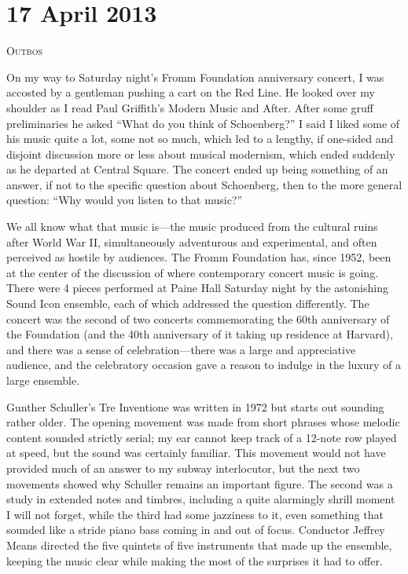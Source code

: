 \chapter{17 April 2013}

\textsc{Outbos}

On my way to Saturday night’s Fromm Foundation anniversary concert, I was accosted by a gentleman pushing a cart on the Red Line. He looked over my shoulder as I read Paul Griffith’s Modern Music and After. After some gruff preliminaries he asked “What do you think of Schoenberg?” I said I liked some of his music quite a lot, some not so much, which led to a lengthy, if one-sided and disjoint discussion more or less about musical modernism, which ended suddenly as he departed at Central Square. The concert ended up being something of an answer, if not to the specific question about Schoenberg, then to the more general question: “Why would you listen to that music?”

We all know what that music is—the music produced from the cultural ruins after World War II, simultaneously adventurous and experimental, and often perceived as hostile by audiences. The Fromm Foundation has, since 1952, been at the center of the discussion of where contemporary concert music is going. There were 4 pieces performed at Paine Hall Saturday night by the astonishing Sound Icon ensemble, each of which addressed the question differently. The concert was the second of two concerts commemorating the 60th anniversary of the Foundation (and the 40th anniversary of it taking up residence at Harvard), and there was a sense of celebration—there was a large and appreciative audience, and the celebratory occasion gave a reason to indulge in the luxury of a large ensemble.

Gunther Schuller’s Tre Inventione was written in 1972 but starts out sounding rather older. The opening movement was made from short phrases whose melodic content sounded strictly serial; my ear cannot keep track of a 12-note row played at speed, but the sound was certainly familiar. This movement would not have provided much of an answer to my subway interlocutor, but the next two movements showed why Schuller remains an important figure. The second was a study in extended notes and timbres, including a quite alarmingly shrill moment I will not forget, while the third had some jazziness to it, even something that sounded like a stride piano bass coming in and out of focus. Conductor Jeffrey Means directed the five quintets of five instruments that made up the ensemble, keeping the music clear while making the most of the surprises it had to offer.

